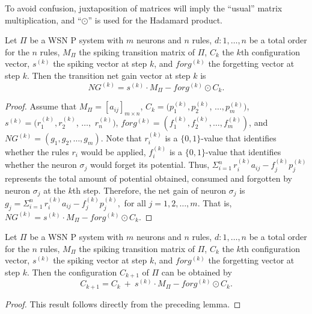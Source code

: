 \documentclass[runningheads]{llncs}
\begin{document}
To avoid confusion, juxtaposition of matrices will imply the
``usual'' matrix multiplication, and ``$\odot$'' is used for the
Hadamard product.

\begin{lemma}
Let $\Pi$ be a WSN P system with $m$ neurons and $n$ rules,
$d:1,\dots, n$ be a total order for the $n$ rules, $M_{\Pi}$ the
spiking transition matrix of $\Pi$, $C_k$ the $k$th configuration
vector, $s^{(k)}$ the spiking vector at step $k$, and $forg^{(k)}$
the forgetting vector at step $k$. Then the transition net gain
vector at step $k$ is
\begin{equation}\label{transition-gain-wtsnp}
NG^{(k)} = s^{(k)}\cdot M_{\Pi}-forg^{(k)}\odot C_{k}.
\end{equation}
\end{lemma}

\begin{proof}
Assume that $M_{\Pi}=[a_{ij}]_{m\times n}$, $C_{k} = (p_{1}^{(k)},
p_{2}^{(k)}$, $\ldots, p_{m}^{(k)})$, $s^{(k)} = (r_1^{(k)},
r_2^{(k)}$, $\ldots,$ $r_n^{(k)})$,  $forg^{(k)} = (f_1^{(k)},
f_2^{(k)}, \ldots , f_m^{(k)})$, and $NG^{(k)}= (g_{1}, g_{2},
\ldots , g_{m})$.  Note that $r_i^{(k)}$ is a $\{0,1\}$-value that
identifies whether the rules $r_i$ would be applied, $f_i^{(k)}$ is
a $\{0,1\}$-value that identifies whether the neuron $\sigma_j$
would forget its potential. Thus, $\Sigma_{i=1}^{n}\,
r_{i}^{(k)}a_{ij}-f_{j}^{(k)}p_j^{(k)}$ represents the total amount
of potential obtained, consumed and forgotten by neuron $\sigma_{j}$
at the $k$th step. Therefore, the net gain of neuron $\sigma_j$ is
$g_{j}=\Sigma_{i=1}^{n}\, r_{i}^{(k)}a_{ij}-f_{j}^{(k)}p_j^{(k)},$
for all $j = 1,2, \ldots ,m$. That is, $NG^{(k)} = s^{(k)}\cdot
M_{\Pi}-forg^{(k)}\odot C_{k}.$
\end{proof}

\begin{theorem}
Let $\Pi$ be a WSN P system with $m$ neurons and $n$ rules,
$d:1,\dots, n$ be a total order for the $n$ rules, $M_{\Pi}$ the
spiking transition matrix of $\Pi$, $C_k$ the $k$th configuration
vector,  $s^{(k)}$ the spiking vector at step $k$, and $forg^{(k)}$
the forgetting vector at step $k$. Then the configuration $C_{k+1}$
of $\Pi$ can be obtained by
\begin{equation}\label{next-config}
C_{k+1} =  C_{k} ~ + ~ s^{(k)}\cdot M_{\Pi}-forg^{(k)}\odot C_{k}.
\end{equation}
\end{theorem}
\begin{proof}
This result follows directly from the preceding lemma.
\end{proof}
\end{document}
